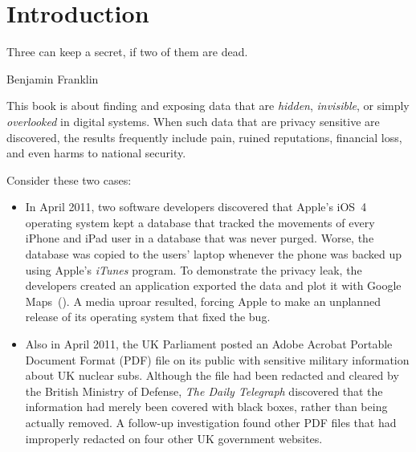 \chapter{Introduction}\label{ch:introduction}
\setlength{\epigraphwidth}{3in}
\epigraph{Three can keep a secret, if two of them are dead.}{Benjamin
  Franklin}

This book is about finding and exposing data that are \emph{hidden},
\emph{invisible}, or simply \emph{overlooked} in digital systems. When
such data that are privacy sensitive are discovered, the results
frequently include pain, ruined
reputations, financial loss, and even harms to national
security. 

Consider these two cases:

\begin{itemize}
\item In April 2011, two software developers discovered that
Apple's iOS~4 operating system kept a database that tracked the movements of every
iPhone and iPad user in a database that was never purged. Worse, the database was copied to the users'
laptop  whenever the phone was backed up using Apple's \emph{iTunes}
program\cite{apple-tracking}. To demonstrate the privacy leak, the developers created an application
exported the data and plot it with Google Maps~(). A
media uproar resulted, forcing 
Apple to make an unplanned release of its operating system that fixed
the bug\cite{apple-tracking-statement}. 

\item Also in April 2011, the UK Parliament posted an Adobe Acrobat Portable
Document Format (PDF) file on its public with sensitive military
information about UK nuclear subs. Although the file had been
redacted and cleared by the British Ministry of Defense,  \emph{The
  Daily Telegraph} discovered that the information had merely been
covered with black boxes, rather than being 
actually removed. A follow-up investigation 
found other PDF files that had improperly redacted on four other UK government
websites\cite{telegraph-april2011-secrets}.
\end{itemize}

